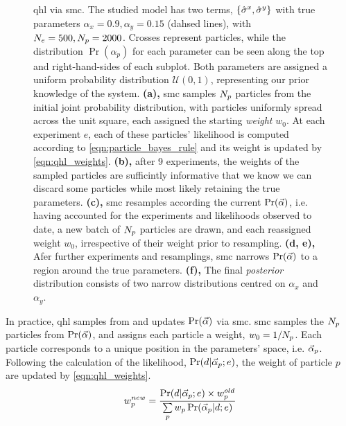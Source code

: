 \begin{figure}
{    }
    \caption[Quantum Hamiltonian learning via sequential Monte carlo]{
    \Acrfull{qhl} via \acrfull{smc}. 
    The studied model has two terms, $\{\hat{\sigma}^{x}, \hat{\sigma}^{y}\}$ with true parameters $\alpha_{x}=0.9, \alpha_y=0.15$ (dahsed lines), 
        with $N_e=500, N_p=2000$. 
    Crosses represent particles, while the distribution $\Pr(\alpha_p)$ for each 
        parameter can be seen along the top and right-hand-sides of each subplot. 
    Both parameters are assigned a uniform probability distribution $\mathcal{U}(0,1)$, representing our prior knowledge of the system. 
    \textbf{(a), }\gls{smc} samples $N_p$ particles from the initial joint probability distribution, 
        with particles uniformly spread across the unit square, each assigned the starting \emph{weight} $w_0$. 
        At each experiment $e$, each of these particles' likelihood is computed according to \cref{eqn:particle_bayes_rule}
        and its weight is updated by \cref{eqn:qhl_weights}.
    \textbf{(b),} after 9 experiments, the weights of the sampled particles are sufficintly informative that we know we can 
        discard some particles while most likely retaining the true parameters. 
    \textbf{(c),} \gls{smc} resamples according the current $\Pr(\vec{\alpha})$, 
        i.e. having accounted for the experiments and likelihoods observed to date, 
        a new batch of $N_p$ particles are drawn, and each reassigned weight $w_0$, 
        irrespective of their weight prior to resampling.  
    \textbf{(d, e),} Afer further experiments and resamplings, \gls{smc} narrows $\Pr(\vec{\alpha})$ to a region around the true parameters. 
    \textbf{(f),} The final \emph{posterior} distribution consists of two narrow distributions centred on $\alpha_x$ and $\alpha_y$. 
    }
    \label{fig:qhl_smc}
\end{figure}

In practice, \gls{qhl} samples from and updates $\Pr(\vec{\alpha})$  via \gls{smc}.
\gls{smc} samples the $N_p$ particles from $\Pr(\vec{\alpha})$, and assigns each particle a weight, $w_0 = 1/N_p$.
Each particle corresponds to a unique position in the parameters' space, i.e. $\vec{\alpha}_p$.
Following the calculation of the likelihood, $\Pr(d | \vec{\alpha}_p; e)$, 
    the weight of particle $p$ are updated by \cref{eqn:qhl_weights}.
\begin{equation}\label{eqn:qhl_weights}
    w_p^{new} = \frac{\Pr(d | \vec{\alpha}_p; e) \times w_p^{old} } { \sum\limits_{p} w_p \Pr(\vec{\alpha}_p | d; e) }
\end{equation}


